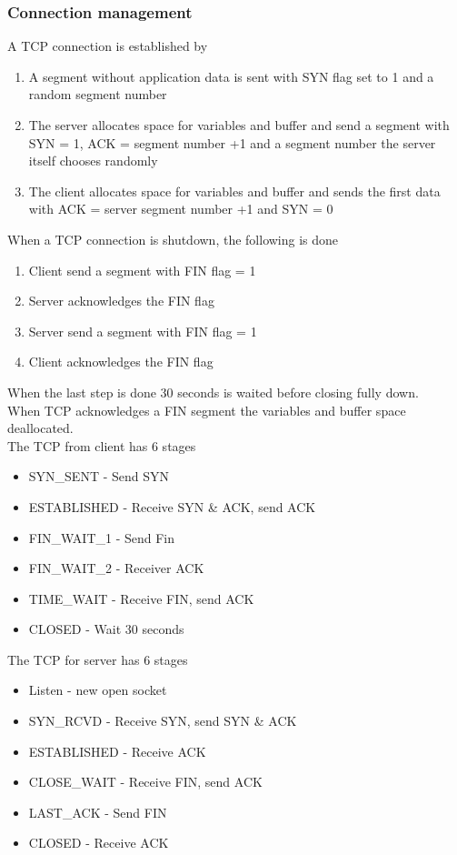 \documentclass[12pt, a4paper]{article}
\begin{document}
			\subsubsection{Connection management}
				A TCP connection is established by
				\begin{enumerate}
					\item A segment without application data is sent with SYN flag set to 1 and a random segment number
					\item The server allocates space for variables and buffer and send a segment with SYN = 1, ACK = segment number +1 and a segment number the server itself chooses randomly
					\item The client allocates space for variables and buffer and sends the first data with ACK = server segment number +1 and SYN = 0
				\end{enumerate}
				When a TCP connection is shutdown, the following is done
				\begin{enumerate}
					\item Client send a segment with FIN flag = 1
					\item Server acknowledges the FIN flag
					\item Server send a segment with FIN flag = 1
					\item Client acknowledges the FIN flag 
				\end{enumerate}
				When the last step is done 30 seconds is waited before closing fully down.\\
				When TCP acknowledges a FIN segment the variables and buffer space deallocated.\\
				The TCP from client has 6 stages
				\begin{itemize}	
					\item SYN\_SENT - Send SYN
					\item ESTABLISHED - Receive SYN \& ACK, send ACK
					\item FIN\_WAIT\_1 - Send Fin
					\item FIN\_WAIT\_2 - Receiver ACK
					\item TIME\_WAIT - Receive FIN, send ACK
					\item CLOSED - Wait 30 seconds
				\end{itemize}
				The TCP for server has 6 stages
				\begin{itemize}
					\item Listen - new open socket
					\item SYN\_RCVD - Receive SYN, send SYN \& ACK
					\item ESTABLISHED - Receive ACK
					\item CLOSE\_WAIT - Receive FIN, send ACK
					\item LAST\_ACK - Send FIN
					\item CLOSED - Receive ACK
				\end{itemize}
				
\end{document}
